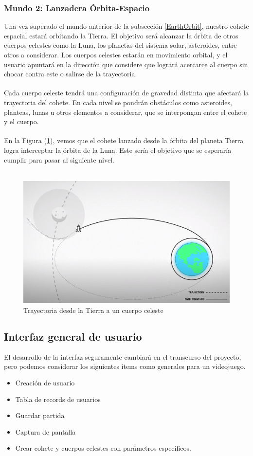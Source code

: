 \documentclass{article}
\begin{document}
\subsubsection{Mundo 2: Lanzadera Órbita-Espacio}
Una vez superado el mundo anterior de la subsección \ref{EarthOrbit}, nuestro cohete espacial estará orbitando la Tierra. El objetivo será alcanzar la órbita de otros cuerpos celestes como la Luna, los planetas del sistema solar, asteroides, entre otros a considerar. Los cuerpos celestes estarán en movimiento orbital, y el usuario apuntará en la dirección que considere que logrará acercarce al cuerpo sin chocar contra este o salirse de la trayectoria.
\\\\
Cada cuerpo celeste tendrá una configuración de gravedad distinta que afectará la trayectoria del cohete. En cada nivel se pondrán obstáculos como asteroides, planteas, lunas u otros elementos a considerar, que se interpongan entre el cohete y el cuerpo.
\\\\
En la Figura (\ref{fig:trayect_EarthMoon}), vemos que el cohete lanzado desde la órbita del planeta Tierra logra interceptar la órbita de la Luna. Este sería el objetivo que se esperaría cumplir para pasar al siguiente nivel.
\\\

\begin{figure}[h]
\includegraphics[width=12cm]{trayect_EarthMoon.png}
\centering
\caption{Trayectoria desde la Tierra a un cuerpo celeste\cite{earthMoon}}
\label{fig:trayect_EarthMoon}
\end{figure}

\subsection{Interfaz general de usuario}
El desarrollo de la interfaz seguramente cambiará en el transcurso del proyecto, pero podemos considerar los siguientes items como generales para un videojuego. 

\begin{itemize}
    \item Creación de usuario
    \item Tabla de records de usuarios
    \item Guardar partida
    \item Captura de pantalla
    \item Crear cohete y cuerpos celestes con parámetros específicos.
\end{itemize}

\clearpage


\end{document}
